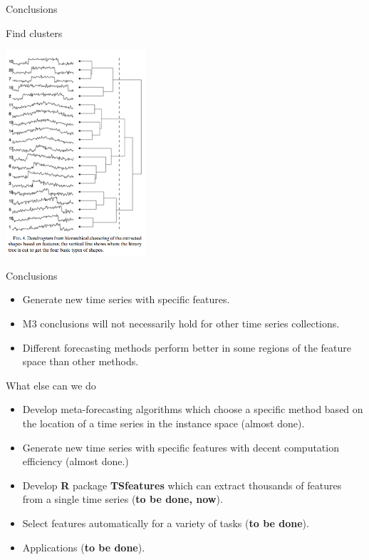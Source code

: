 \documentclass[12pt,ignorenonframetext,compress]{beamer}
\providecommand{\tightlist}{%
\setlength{\itemsep}{0pt}\setlength{\parskip}{0pt}}
\begin{document}
\begin{frame}{Conclusions}

\begin{block}{Find clusters}

\centerline{\includegraphics[height=3in]{figures/clustering1.png}}

\end{block}

\end{frame}

\begin{frame}{Conclusions}

\begin{itemize}
\tightlist
\item
  Generate new time series with specific features.
\item
  M3 conclusions will not necessarily hold for other time series
  collections.
\item
  Different forecasting methods perform better in some regions of the
  feature space than other methods.
\end{itemize}

\end{frame}

\begin{frame}{What else can we do}

\begin{itemize}
\tightlist
\item
  Develop meta-forecasting algorithms which choose a specific method
  based on the location of a time series in the instance space (almost
  done).
\item
  Generate new time series with specific features with decent
  computation efficiency (almost done.)
\item
  Develop \textbf{R} package \textbf{TSfeatures} which can extract
  thousands of features from a single time series (\textbf{to be done,
  now}).
\item
  Select features automatically for a variety of tasks (\textbf{to be
  done}).
\item
  Applications (\textbf{to be done}).
\end{itemize}

\end{frame}
\end{document}

